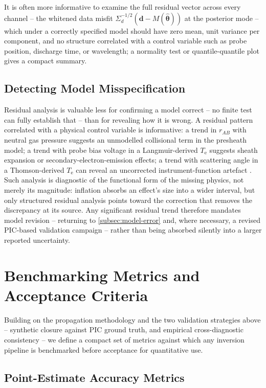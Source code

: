 It is often more informative to examine the full residual vector across every channel -- the whitened data misfit $\Sigma_{d}^{-1/2}\left(\mathbf{d} - M(\hat{\boldsymbol{\theta}})\right)$ at the posterior mode -- which under a correctly specified model should have zero mean, unit variance per component, and no structure correlated with a control variable such as probe position, discharge time, or wavelength; a normality test or quantile-quantile plot gives a compact summary.

\subsection{Detecting Model Misspecification}
\label{subsec:misspecification}

Residual analysis is valuable less for confirming a model correct -- no finite test can fully establish that -- than for revealing how it is wrong. A residual pattern correlated with a physical control variable is informative: a trend in $r_{AB}$ with neutral gas pressure suggests an unmodelled collisional term in the presheath model; a trend with probe bias voltage in a Langmuir-derived $T_{\mathrm{e}}$ suggests sheath expansion or secondary-electron-emission effects; a trend with scattering angle in a Thomson-derived $T_{\mathrm{e}}$ can reveal an uncorrected instrument-function artefact \cite{ref0360}. Such analysis is diagnostic of the functional form of the missing physics, not merely its magnitude: inflation absorbs an effect's size into a wider interval, but only structured residual analysis points toward the correction that removes the discrepancy at its source. Any significant residual trend therefore mandates model revision -- returning to \cref{subsec:model-error} and, where necessary, a revised PIC-based validation campaign -- rather than being absorbed silently into a larger reported uncertainty.

\section{Benchmarking Metrics and Acceptance Criteria}
\label{sec:benchmarking}

Building on the propagation methodology and the two validation strategies above -- synthetic closure against PIC ground truth, and empirical cross-diagnostic consistency -- we define a compact set of metrics against which any inversion pipeline is benchmarked before acceptance for quantitative use.

\subsection{Point-Estimate Accuracy Metrics}
\label{subsec:point-metrics}

